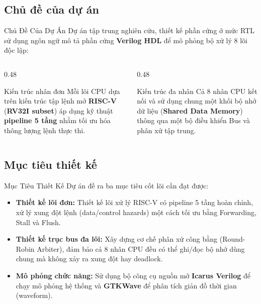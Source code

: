 \subsection{Chủ đề của dự án}
\begin{frame}{Chủ Đề Của Dự Án}
    Dự án tập trung nghiên cứu, thiết kế phần cứng ở mức RTL sử dụng ngôn ngữ mô tả phần cứng \textbf{Verilog HDL} để mô phỏng bộ xử lý 8 lõi độc lập:
    
    \vspace{0.2cm}
    \begin{columns}[T]
        \begin{column}{0.48\textwidth}
            \begin{block}{Kiến trúc nhân đơn}
                \small
                Mỗi lõi CPU dựa trên kiến trúc tập lệnh mở \textbf{RISC-V} (\textbf{RV32I subset}) áp dụng kỹ thuật \textbf{pipeline 5 tầng} nhằm tối ưu hóa thông lượng lệnh thực thi.
            \end{block}
        \end{column}
        
        \begin{column}{0.48\textwidth}
            \begin{block}{Kiến trúc đa nhân}
                \small
                Cả 8 nhân CPU kết nối và sử dụng chung một khối bộ nhớ dữ liệu (\textbf{Shared Data Memory}) thông qua một bộ điều khiển Bus và phân xử tập trung.
            \end{block}
        \end{column}
    \end{columns}
\end{frame}

\subsection{Mục tiêu thiết kế}
\begin{frame}{Mục Tiêu Thiết Kế}
    Dự án đề ra ba mục tiêu cốt lõi cần đạt được:
    
    \vspace{0.25cm}
    \begin{itemize}
        \item \textbf{Thiết kế lõi đơn:} Thiết kế lõi xử lý RISC-V có pipeline 5 tầng hoàn chỉnh, xử lý xung đột lệnh (data/control hazards) một cách tối ưu bằng Forwarding, Stall và Flush.
        \item \textbf{Thiết kế trục bus đa lõi:} Xây dựng cơ chế phân xử công bằng (Round-Robin Arbiter), đảm bảo cả 8 nhân CPU đều có thể ghi/đọc bộ nhớ dùng chung mà không xảy ra xung đột hay deadlock.
        \item \textbf{Mô phỏng chức năng:} Sử dụng bộ công cụ nguồn mở \textbf{Icarus Verilog} để chạy mô phỏng hệ thống và \textbf{GTKWave} để phân tích giản đồ thời gian (waveform).
    \end{itemize}
\end{frame}

